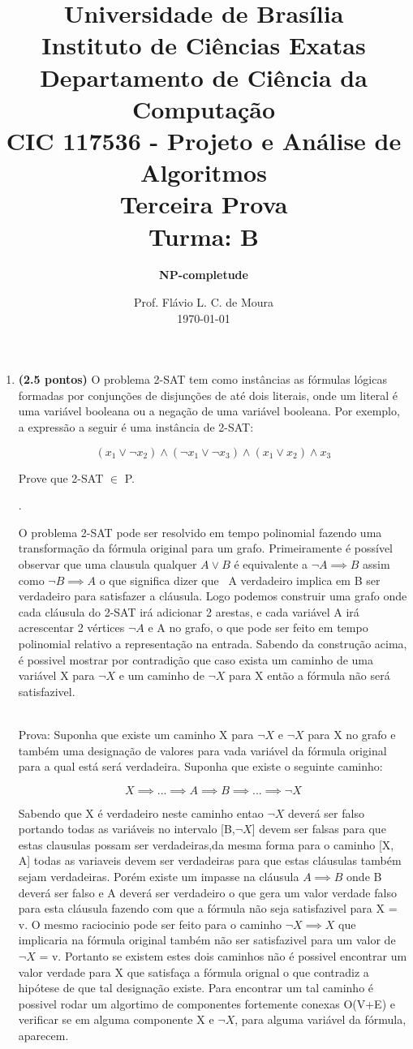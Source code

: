\documentclass[12pt]{article}
\title{{\large Universidade de Brasília \\ Instituto de Ciências Exatas \\
Departamento de Ciência da Computação} \\[1cm]
CIC 117536 - Projeto e Análise de Algoritmos \\[.5cm]  Terceira Prova \\[.5cm] Turma: B}
\author{{\bf NP-completude}}
\date{Prof. Flávio L. C. de Moura \\[.5cm] \today}
\newcommand{\resposta}[1]{ \noindent {\bf Solução}.{\color{blue} #1}}
\begin{document}
\maketitle

\begin{enumerate}
\item {\bf (2.5 pontos)} O problema 2-SAT tem como instâncias as
  fórmulas lógicas formadas por conjunções de disjunções de até dois
  literais, onde um literal é uma variável booleana ou a negação de
  uma variável booleana. Por exemplo, a expressão a seguir é uma
  instância de 2-SAT:

  $$(x_1\lor \neg x_2)\land (\neg x_1 \lor \neg x_3) \land (x_1 \lor x_2) \land x_3$$

  Prove que 2-SAT $\in$ P.

 
 \resposta{
    O problema 2-SAT pode ser resolvido em tempo polinomial fazendo uma transformação da fórmula original para um grafo. Primeiramente é possível observar que uma clausula
    qualquer \(A \lor B\) é equivalente a \(\neg A \implies B\) assim como \(\neg B \implies A\) o que significa dizer que ~A verdadeiro implica em B ser verdadeiro para satisfazer a cláusula. Logo podemos
    construir uma grafo onde cada cláusula do 2-SAT irá adicionar 2 arestas, e cada variável A irá acrescentar 2 vértices \(\neg A\) e A no grafo, o que pode ser feito em tempo polinomial relativo a representação na entrada. Sabendo da construção acima, é possivel mostrar por contradição que caso exista um caminho de uma variável X para \(\neg X\) e um caminho de \(\neg X\) para X então a fórmula não será satisfazivel.

\\ Prova:
	Suponha que existe um caminho X para \(\neg X\) e \(\neg X\) para X no grafo e também uma designação de valores para vada variável da fórmula original para a qual está será verdadeira. Suponha que existe o seguinte caminho:
			
\[X \implies ... \implies A \implies B \implies ... \implies \neg X\]
		
    Sabendo que X é verdadeiro neste caminho entao \(\neg X\) deverá ser falso portando todas as variáveis no intervalo [B,\(\neg X\)] devem ser falsas para que estas clausulas possam ser verdadeiras,da mesma forma para o caminho [X, A] todas as variaveis devem ser verdadeiras para que estas cláusulas também sejam verdadeiras. Porém existe um impasse na cláusula \(A \implies B\) onde B deverá ser falso e A deverá ser verdadeiro o que gera um valor verdade falso para esta cláusula fazendo com que a fórmula não seja satisfazivel para X = v. O mesmo raciocinio pode ser feito para o caminho \(\neg X \implies X\) que implicaria na fórmula original também não ser satisfazivel para um valor de \(\neg X\) = v. Portanto se existem estes dois caminhos não é possivel encontrar um valor verdade para X que satisfaça a fórmula orignal o que contradiz a hipótese de que tal designação existe. Para encontrar um tal caminho é possivel rodar um algortimo de componentes fortemente conexas O(V+E) e verificar se em alguma componente X e \(\neg X\), para alguma variável da fórmula, aparecem.
    
}
\end{enumerate}
\end{document}
